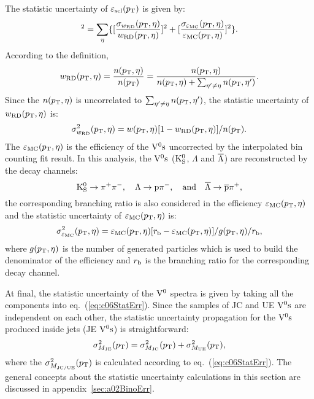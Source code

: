 The statistic uncertainty of $\varepsilon_{\rm scl}(p_{\rm T})$ is given by:
\begin{equation}
[\frac{\sigma_{\varepsilon_{\rm scl}}(\pT)}{\varepsilon_{\rm scl}(\pT)}]^{2}=
\sum_{\eta}
\{[\frac{\sigma_{w_{\rm RD}}(\pT,\eta)}{w_{\rm RD}(\pT,\eta)}]^{2}+
  [\frac{\sigma_{\varepsilon_{\rm MC}}(\pT,\eta)}
        {\varepsilon_{\rm MC}(\pT,\eta)}]^{2}\}.
\end{equation}
According to the definition,
\begin{equation}
w_{\rm RD}(p_{\rm T},\eta)=\frac{n(p_{\rm T},\eta)}{n(p_{\rm T})}=
\frac{n(p_{\rm T},\eta)}{n(p_{\rm T},\eta)+\sum_{\eta'\neq\eta}n(p_{\rm T},\eta')}.
\end{equation}
Since the $n(p_{\rm T},\eta)$ is uncorrelated to $\sum_{\eta'\neq\eta}n(p_{\rm T},\eta')$,
the statistic uncertainty of $w_{\rm RD}(p_{\rm T},\eta)$ is:
\begin{equation}
\sigma_{w_{\rm RD}}^{2}(p_{\rm T},\eta)=w(p_{\rm T},\eta)[1-w_{\rm RD}(p_{\rm T},\eta)]/n(p_{\rm T}).
\end{equation}
The $\varepsilon_{\rm MC}(p_{\rm T},\eta)$ is the efficiency of the ${\rm V}^{0}{\rm s}$
uncorrected by the interpolated bin counting fit result.
In this analysis, the ${\rm V}^{0}{\rm s}$ (${\rm K}_{\rm S}^{0}$, $\Lambda$ and $\overline{\Lambda}$) are
reconstructed by the decay channels:
\begin{displaymath}
{\rm K}_{\rm S}^{0}  \to\pi^{+}\pi^{-}, \quad
\Lambda  \to {\rm p}\pi^{-}, \quad {\rm and} \quad
\overline{\Lambda} \to \rm\overline{p}\pi^{+},
\end{displaymath}
the corresponding branching ratio is also considered
in the efficiency $\varepsilon_{\rm MC}(p_{\rm T},\eta)$
and the statistic uncertainty of $\varepsilon_{\rm MC}(p_{\rm T},\eta)$ is:
\begin{equation}
\sigma_{\varepsilon_{\rm MC}}^{2}(p_{\rm T},\eta)=
\varepsilon_{\rm MC}(p_{\rm T},\eta)[r_{\rm b}-\varepsilon_{\rm MC}(p_{\rm T},\eta)]/
g(p_{\rm T},\eta)/r_{\rm b},
\end{equation}
where $g(p_{\rm T},\eta)$ is the number of generated particles which is used to
build the denominator of the efficiency and $r_{\rm b}$ is the branching
ratio for the corresponding decay channel.

At final, the statistic uncertainty of the ${\rm V}^{0}$ spectra is given by
taking all the components into eq.~(\ref{eq:c06StatErr}).
Since the samples of JC and UE ${\rm V}^{0}{\rm s}$ are independent on each other,
the statistic uncertainty propagation for the ${\rm V}^{0}{\rm s}$ produced
inside jets (JE ${\rm V}^{0}{\rm s}$) is straightforward:
\begin{equation}
\sigma_{M_{\rm JE}}^{2}(p_{\rm T})=
\sigma_{M_{\rm JC}}^{2}(p_{\rm T})+\sigma_{M_{\rm UE}}^{2}(p_{\rm T}),
\end{equation}
where the $\sigma_{M_{\rm JC/UE}}^{2}(p_{\rm T})$ is calculated according
to eq.~(\ref{eq:c06StatErr}).
The general concepts about the statistic uncertainty calculations in this
section are discussed in appendix~\ref{sec:a02BinoErr}.

